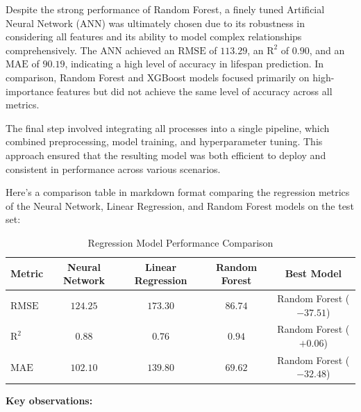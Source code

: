 \documentclass{article}
\begin{document}
Despite the strong performance of Random Forest, a finely tuned Artificial Neural Network (ANN) was ultimately chosen due to its robustness in considering all features and its ability to model complex relationships comprehensively. The ANN achieved an $\text{RMSE}$ of $113.29$, an $\text{R}^2$ of $0.90$, and an $\text{MAE}$ of $90.19$, indicating a high level of accuracy in lifespan prediction. In comparison, Random Forest and XGBoost models focused primarily on high-importance features but did not achieve the same level of accuracy across all metrics.

The final step involved integrating all processes into a single pipeline, which combined preprocessing, model training, and hyperparameter tuning. This approach ensured that the resulting model was both efficient to deploy and consistent in performance across various scenarios.

Here's a comparison table in markdown format comparing the regression metrics of the Neural Network, Linear Regression, and Random Forest models on the test set:

\begin{table}[htbp]
    \centering
    \caption{Regression Model Performance Comparison}
    \begin{tabular}{lcccc}
        \toprule
        \textbf{Metric} & \textbf{Neural Network} & \textbf{Linear Regression} & \textbf{Random Forest} & \textbf{Best Model} \\
        \midrule
        $\text{RMSE}$ & $124.25$ & $173.30$ & $86.74$ & Random Forest (\(-37.51\)) \\
        $\text{R}^2$ & $0.88$ & $0.76$ & $0.94$ & Random Forest (\(+0.06\)) \\
        $\text{MAE}$ & $102.10$ & $139.80$ & $69.62$ & Random Forest (\(-32.48\)) \\
        \bottomrule
    \end{tabular}
    \label{tab:regression_comparison}
\end{table}

\newpage
\noindent\textbf{Key observations:}
\end{document}
